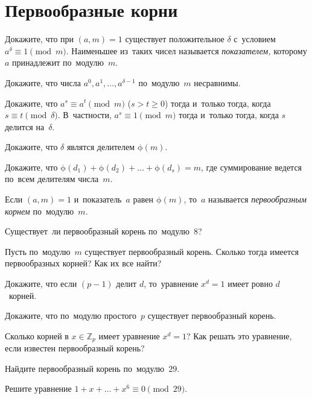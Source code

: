 
\section*{Первообразные корни}


\begingroup
    \ifx\mathup\undefined
        \def\eulerphi{\upphi}%
    \else
        \def\eulerphi{\mathup{\phi}}%
    \fi

\begin{problems}

\item
Докажите, что при $(a, m) = 1$ существует положительное $\delta$ с~условием
$a^{\delta} \equiv 1 \pmod{m}$.
Наименьшее из~таких чисел называется \emph{показателем,} которому $a$
принадлежит по~модулю~$m$.

\item
Докажите, что числа $a^{0}, a^{1}, \ldots, a^{\delta-1}$ по~модулю~$m$
несравнимы.

\item
Докажите, что $a^{s} \equiv a^{t} \pmod{m}$ ($s > t \geq 0$) тогда и~только
тогда, когда $s \equiv t \pmod{\delta}$.
В~частности, $a^{s} \equiv 1 \pmod{m}$ тогда и~только тогда, когда $s$ делится
на~$\delta$.

\item
Докажите, что $\delta$ являтся делителем $\eulerphi(m)$.

\item
Докажите, что
\(
    \eulerphi(d_1) + \eulerphi(d_2) + \ldots + \eulerphi(d_s)
=
    m
\), где суммирование ведется по~всем делителям числа~$m$.

Если $(a, m) = 1$ и~показатель~$a$ равен $\eulerphi(m)$, то~$a$ называется
\emph{первообразным корнем} по~модулю~$m$.

\item
Существует~ли первообразный корень по~модулю~$8$?

\item
Пусть по~модулю~$m$ существует первообразный корень.
Сколько тогда имеется первообразных корней?
Как их все найти?

\item
Докажите, что если $(p - 1)$ делит $d$, то~уравнение $x^d = 1$ имеет ровно
$d$~корней.

\item
Докажите, что по~модулю простого~$p$ существует первообразный корень.

\item
Сколько корней в $x \in \mathbb{Z}_p$ имеет уравнение $x^d = 1$?
Как решать это уравнение, если известен первообразный корень?

\item
Найдите первообразный корень по~модулю~$29$.

\item
Решите уравнение $1 + x + \ldots + x^6 \equiv 0 \pmod{29}$.

\end{problems}

